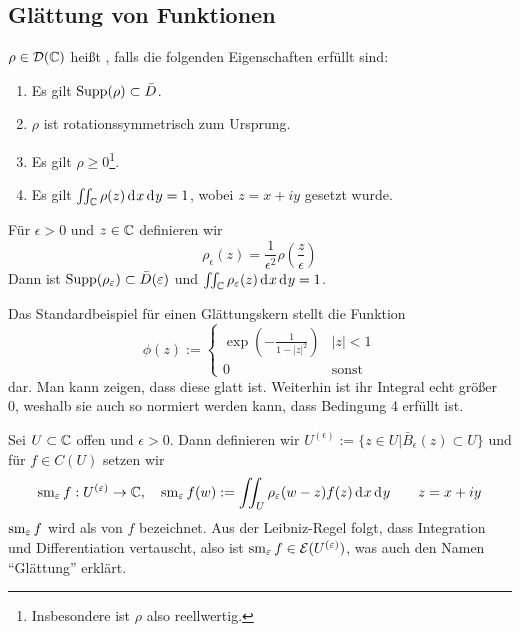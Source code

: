 \subsection{Glättung von Funktionen}
\label{sec:Glättung}

\begin{defin}[Glättungskern]
  $\rho \in \mathcal{D}(\mathbb{C})$ heißt , falls die folgenden
  Eigenschaften erfüllt sind:
  \begin{enumerate}
  \item Es gilt $\operatorname{Supp}(\rho) \subset \bar D$.
  \item $\rho$ ist rotationssymmetrisch zum Ursprung.
  \item Es gilt $\rho \geq 0$\footnote{Insbesondere ist $\rho$ also reellwertig.}.
  \item Es gilt $\iint_\C \rho(z) \d[x]\d[y] = 1$, wobei $z = x + iy$
    gesetzt wurde.
  \end{enumerate}
  Für $\epsilon > 0$ und $z \in \mathbb{C}$ definieren wir
  \[
  \rho_\epsilon(z) = \frac{1}{\epsilon^2} \rho\left(
    \frac{z}{\epsilon} \right )
  \]
  Dann ist $\operatorname{Supp}(\rho_\varepsilon) \subset \bar D(\varepsilon)$ und
  $\iint_\C \rho_\epsilon(z) \d[x]\d[y] = 1$.
\end{defin}


\begin{bsp}
  Das Standardbeispiel für einen Glättungskern stellt die Funktion
  \[
  \phi(z) :=
  \begin{cases}
    \exp \left ( - \frac{1}{1 - |z|^2} \right ) & |z| < 1 \\
    0 & \text{sonst}
  \end{cases}
  \]
  dar. 
  Man kann zeigen, dass diese glatt ist. Weiterhin ist ihr Integral
  echt größer 0, weshalb sie auch so normiert werden kann, dass
  Bedingung 4 erfüllt ist.
\end{bsp}

\begin{defin}
  Sei $U \subset \mathbb{C}$ offen und $\epsilon > 0$. Dann definieren wir
  $U^{(\epsilon)} := \{z \in U | \bar B_\epsilon(z) \subset U \}$ und
  für $f \in C(U)$ setzen wir
  \[
  \sm_\epsilon f : U^{(\epsilon)} \ra \C, \quad \sm_\epsilon f(w) :=
  \iint_U \rho_\epsilon(w- z) f(z) \d[x]\d[y] \qquad z = x + iy
  \]
  $\operatorname{sm}_\varepsilon f$ wird als  von $f$ bezeichnet. 
  Aus der Leibniz-Regel folgt, dass Integration und Differentiation
  vertauscht, also ist $\operatorname{sm}_\varepsilon f \in \mathcal{E}(U^{(\varepsilon)})$, was
  auch den Namen "`Glättung"' erklärt.
\end{defin}

